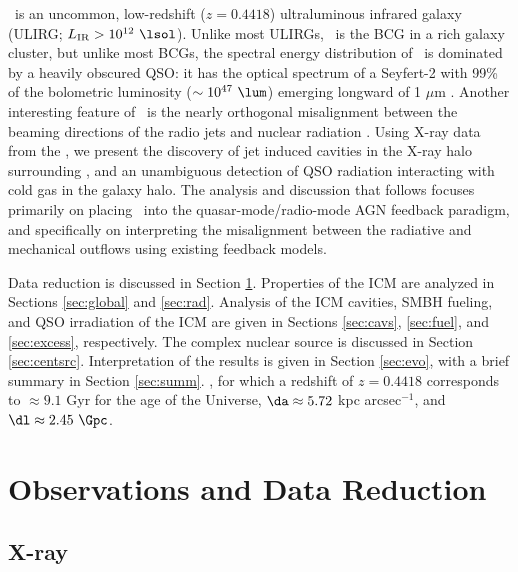 \documentclass[useAMS,usenatbib]{mn2e}
\begin{document}
\irs\ is an uncommon, low-redshift ($z = 0.4418$) ultraluminous
infrared galaxy (ULIRG; $L_{\mathrm{IR}} > 10^{12} ~\lsol$). Unlike
most ULIRGs, \irs\ is the BCG in a rich galaxy cluster, but unlike
most BCGs, the spectral energy distribution of \irs\ is dominated by a
heavily obscured QSO: it has the optical spectrum of a Seyfert-2 with
99\% of the bolometric luminosity ($\sim 10^{47} ~\lum$) emerging
longward of 1 $\mu$m \citep[][see also Section
  \ref{sec:centsrc}]{1988ApJ...328..161K, 1993ApJ...415...82H,
  1994ApJ...436L..51F, 1998ApJ...506..205E, 2000A&A...353..910F,
  2001MNRAS.321L..15I}. Another interesting feature of \irs\ is the
nearly orthogonal misalignment between the beaming directions of the
radio jets and nuclear radiation \citep{1999ApJ...512..145H}. Using
X-ray data from the \cxo, we present the discovery of jet induced
cavities in the X-ray halo surrounding \irs, and an unambiguous
detection of QSO radiation interacting with cold gas in the galaxy
halo. The analysis and discussion that follows focuses primarily on
placing \irs\ into the quasar-mode/radio-mode AGN feedback paradigm,
and specifically on interpreting the misalignment between the
radiative and mechanical outflows using existing feedback models.

Data reduction is discussed in Section \ref{sec:obs}. Properties of
the ICM are analyzed in Sections \ref{sec:global} and
\ref{sec:rad}. Analysis of the ICM cavities, SMBH fueling, and QSO
irradiation of the ICM are given in Sections \ref{sec:cavs},
\ref{sec:fuel}, and \ref{sec:excess}, respectively. The complex
nuclear source is discussed in Section
\ref{sec:centsrc}. Interpretation of the results is given in Section
\ref{sec:evo}, with a brief summary in Section \ref{sec:summ}. \LCDM,
for which a redshift of $z = 0.4418$ corresponds to $\approx 9.1$ Gyr
for the age of the Universe, $\da \approx 5.72$ kpc arcsec$^{-1}$, and
$\dl \approx 2.45~\Gpc$.

\section{Observations and Data Reduction}
\label{sec:obs}

\subsection{X-ray}
\label{sec:xray}
\end{document}

